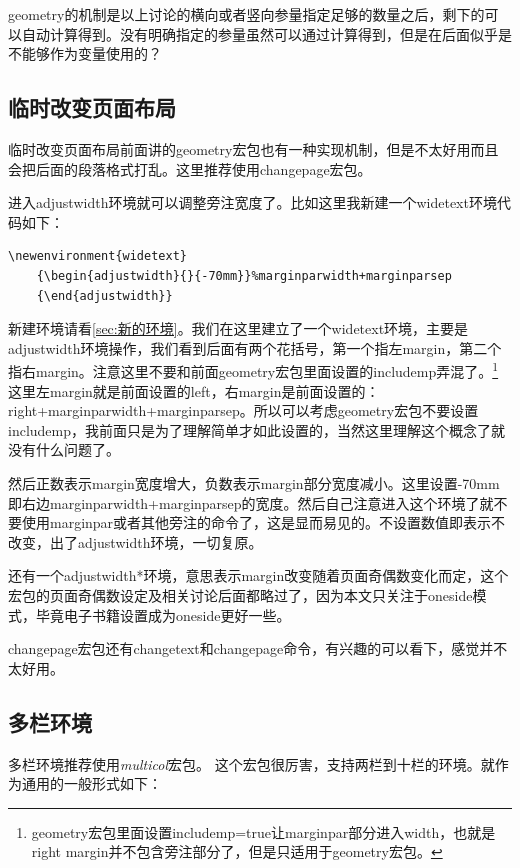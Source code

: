 \documentclass[12pt,oneside]{book}
\begin{document}
\begin{common-format}
geometry的机制是以上讨论的横向或者竖向参量指定足够的数量之后，剩下的可以自动计算得到。没有明确指定的参量虽然可以通过计算得到，但是在后面似乎是不能够作为变量使用的？


\subsection{临时改变页面布局}
临时改变页面布局前面讲的geometry宏包也有一种实现机制，但是不太好用而且会把后面的段落格式打乱。这里推荐使用changepage宏包。

进入adjustwidth环境就可以调整旁注宽度了。比如这里我新建一个widetext环境代码如下：

\begin{Verbatim}
\newenvironment{widetext}  
	{\begin{adjustwidth}{}{-70mm}}%marginparwidth+marginparsep
	{\end{adjustwidth}}
\end{Verbatim}  

新建环境请看\ref{sec:新的环境}。我们在这里建立了一个widetext环境，主要是adjustwidth环境操作，我们看到后面有两个花括号，第一个指左margin，第二个指右margin。注意这里不要和前面geometry宏包里面设置的includemp弄混了。\footnote{geometry宏包里面设置includemp=true让marginpar部分进入width，也就是right margin并不包含旁注部分了，但是只适用于geometry宏包。}这里左margin就是前面设置的left，右margin是前面设置的：\\right+marginparwidth+marginparsep。所以可以考虑geometry宏包不要设置includemp，我前面只是为了理解简单才如此设置的，当然这里理解这个概念了就没有什么问题了。

然后正数表示margin宽度增大，负数表示margin部分宽度减小。这里设置-70mm即右边marginparwidth+marginparsep的宽度。然后自己注意进入这个环境了就不要使用marginpar或者其他旁注的命令了，这是显而易见的。不设置数值即表示不改变，出了adjustwidth环境，一切复原。

还有一个adjustwidth*环境，意思表示margin改变随着页面奇偶数变化而定，这个宏包的页面奇偶数设定及相关讨论后面都略过了，因为本文只关注于oneside模式，毕竟电子书籍设置成为oneside更好一些。

changepage宏包还有changetext和changepage命令，有兴趣的可以看下，感觉并不太好用。


\subsection{多栏环境}
多栏环境推荐使用\emph{multicol}宏包。
这个宏包很厉害，支持两栏到十栏的环境。就作为通用的一般形式如下：


\end{common-format}
\end{document}
